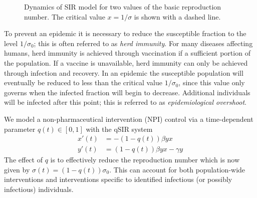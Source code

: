 \documentclass[english,12pt]{article}
\newcommand{\Rnot}{\sigma_0}
\begin{document}
\begin{figure}
    \centering
    \caption{Dynamics of SIR model for two values of the basic reproduction number.
            The critical value $x=1/\sigma$ is shown with a dashed line.\label{fig:dynamics}}
\end{figure}

To prevent an epidemic it is necessary to reduce the susceptible
fraction to the level $1/\Rnot$; this is often referred to as {\em herd
immunity}.  For many diseases affecting humans, herd immunity is achieved
through vaccination if a sufficient portion of the population.  If a vaccine
is unavailable, herd immunity can only be achieved through infection and recovery.
In an epidemic the susceptible population will eventually be reduced
to less than the critical value $1/\Rnot$, since this value only governs
when the infected fraction will begin to decrease.  Additional individuals
will be infected after this point; this is referred to as {\em epidemiological
overshoot}.

We model a non-pharmaceutical intervention (NPI) control via a time-dependent
parameter $q(t)\in[0,1]$ with the qSIR system
\begin{subequations} \label{SIRq}
\begin{align}
    x'(t) & = -(1-q(t))\beta y x \\
    y'(t) & = (1-q(t))\beta y x - \gamma y
\end{align}
\end{subequations}
The effect of $q$ is to effectively reduce the reproduction number which is now
given by $\sigma(t) = (1-q(t))\Rnot$.  This can account for both
population-wide interventions and interventions specific to identified infectious
(or possibly infectious) individuals.  
\end{document}
